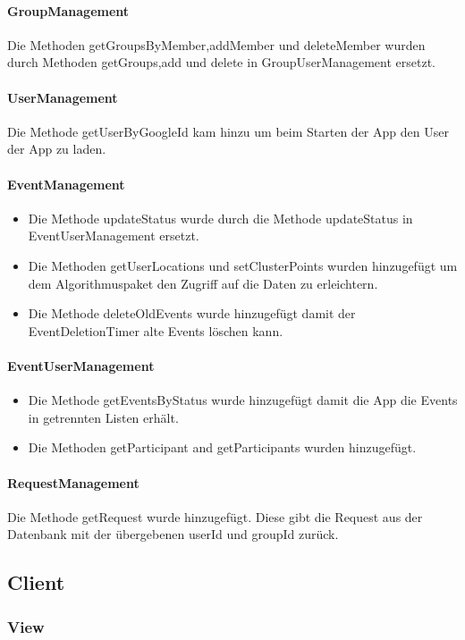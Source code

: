 \documentclass{scrartcl}
\begin{document}
	\paragraph{GroupManagement}	
	Die Methoden getGroupsByMember,addMember und deleteMember wurden durch Methoden getGroups,add und delete in GroupUserManagement ersetzt.
	\paragraph{UserManagement}	
	Die Methode getUserByGoogleId kam hinzu um beim Starten der App den User der App zu laden.
	\paragraph{EventManagement}	
	\begin{itemize}
\item 	Die Methode updateStatus wurde durch die Methode updateStatus in EventUserManagement ersetzt.
\item 	Die Methoden getUserLocations und setClusterPoints wurden hinzugefügt um dem Algorithmuspaket den Zugriff auf die Daten zu erleichtern.
\item	Die Methode deleteOldEvents wurde hinzugefügt damit der EventDeletionTimer alte Events löschen kann.	
	\end{itemize}

	\paragraph{EventUserManagement}		
	
	\begin{itemize}
\item 		Die Methode getEventsByStatus wurde hinzugefügt damit die App die Events in getrennten Listen erhält.
\item Die Methoden getParticipant and getParticipants wurden hinzugefügt.
	\end{itemize}

		\paragraph{RequestManagement}		
	Die Methode getRequest wurde hinzugefügt. Diese gibt die Request aus der Datenbank mit der übergebenen userId und groupId zurück.
	\subsection{Client}
	\subsubsection{View}
\end{document}
